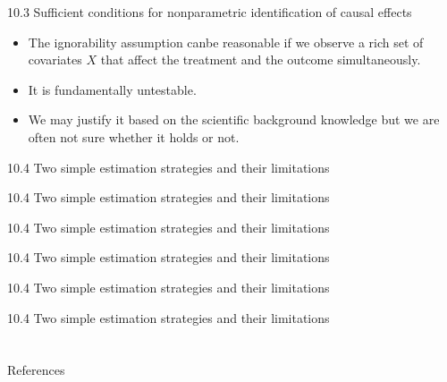 \documentclass[aspectratio=169, 12pt]{beamer}
\begin{document}
\begin{frame}{10.3 Sufficient conditions for nonparametric identification of causal effects}
  \begin{itemize}
    \item The ignorability assumption canbe reasonable if we observe a rich set of covariates $X$ that affect the treatment and the outcome simultaneously.
    \item It is fundamentally untestable.
    \item We may justify it based on the scientific background knowledge but we are often not sure whether it holds or not.
  \end{itemize}
\end{frame}

\begin{frame}{10.4 Two simple estimation strategies and their limitations}
  
\end{frame}

\begin{frame}{10.4 Two simple estimation strategies and their limitations}
  
\end{frame}

\begin{frame}{10.4 Two simple estimation strategies and their limitations}
  
\end{frame}

\begin{frame}{10.4 Two simple estimation strategies and their limitations}
  
\end{frame}

\begin{frame}{10.4 Two simple estimation strategies and their limitations}
  
\end{frame}

\begin{frame}{10.4 Two simple estimation strategies and their limitations}
  
\end{frame}



\section{}
\begin{frame}{References}
  \beamerdefaultoverlayspecification{}
  \small
  
\end{frame}
\end{document}
